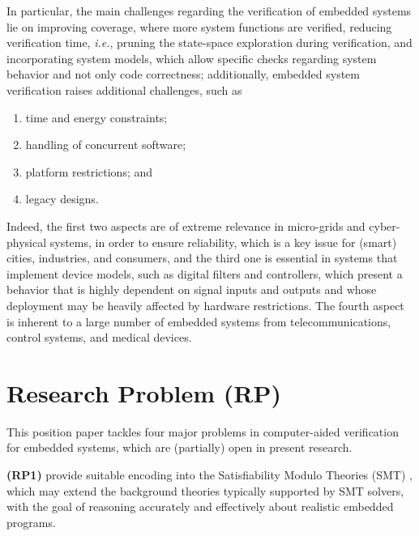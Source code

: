 \documentclass{acm_sen_article}
\begin{document}
In particular, the main challenges regarding the verification of embedded systems lie on improving coverage, where more system functions are verified, reducing verification time, {\it i.e.}, pruning the state-space exploration during verification, and incorporating system models, which allow specific checks regarding system behavior and not only code correctness; additionally, embedded system verification raises additional challenges, such as 
%
\begin{enumerate}
	\item time and energy constraints;
	\item handling of concurrent software;
	\item platform restrictions; and
	\item legacy designs.%
\end{enumerate}

Indeed, the first two aspects are of extreme relevance in micro-grids and cyber-physical systems, in order to ensure reliability, which is a key issue for (smart) cities, industries, and consumers, and the third one is essential in systems that implement device models, such as digital filters and controllers, which present a behavior that is highly dependent on signal inputs and outputs and whose deployment may be heavily affected by hardware restrictions. The fourth aspect is inherent to a large number of embedded systems from  telecommunications, control systems, and medical devices.


\section{Research Problem (RP)}

This position paper tackles four major problems in computer-aided verification for embedded systems, which are (partially) open in present research.

\textbf{(RP1)} provide suitable encoding into the Satisfiability Modulo Theories (SMT) \cite{BarrettSST09}, which may extend the background theories typically supported by SMT solvers, with the goal of reasoning accurately and effectively about realistic embedded programs.
\end{document}
